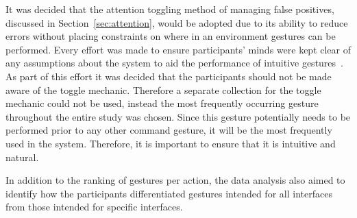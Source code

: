 \documentclass[manuscript, review, screen]{acmart}
\begin{document}
It was decided that the attention toggling method of managing false positives, discussed in Section~\ref{sec:attention}, would be adopted due to its ability to reduce errors without placing constraints on where in an environment gestures can be performed.
Every effort was made to ensure participants' minds were kept clear of any assumptions about the system to aid the performance of intuitive gestures~\citep{Nielsen2004}.
As part of this effort it was decided that the participants should not be made aware of the toggle mechanic.
Therefore a separate collection for the toggle mechanic could not be used, instead the most frequently occurring gesture throughout the entire study was chosen.
Since this gesture potentially needs to be performed prior to any other command gesture, it will be the most frequently used in the system.
Therefore, it is important to ensure that it is intuitive and natural.

In addition to the ranking of gestures per action, the data analysis also aimed to identify how the participants differentiated gestures intended for all interfaces from those intended for specific interfaces.




\end{document}
